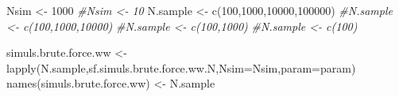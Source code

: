 \documentclass[
]{book}
\newenvironment{Shaded}{\begin{snugshade}}{\end{snugshade}}
\newcommand{\AttributeTok}[1]{\textcolor[rgb]{0.77,0.63,0.00}{#1}}
\newcommand{\CommentTok}[1]{\textcolor[rgb]{0.56,0.35,0.01}{\textit{#1}}}
\newcommand{\DecValTok}[1]{\textcolor[rgb]{0.00,0.00,0.81}{#1}}
\newcommand{\FunctionTok}[1]{\textcolor[rgb]{0.00,0.00,0.00}{#1}}
\newcommand{\NormalTok}[1]{#1}
\newcommand{\OtherTok}[1]{\textcolor[rgb]{0.56,0.35,0.01}{#1}}
\theoremstyle{definition}
\theoremstyle{definition}
\theoremstyle{definition}
\theoremstyle{definition}
\theoremstyle{remark}
\begin{document}
\begin{Shaded}
\begin{Highlighting}[]
\NormalTok{Nsim }\OtherTok{\textless{}{-}} \DecValTok{1000}
\CommentTok{\#Nsim \textless{}{-} 10}
\NormalTok{N.sample }\OtherTok{\textless{}{-}} \FunctionTok{c}\NormalTok{(}\DecValTok{100}\NormalTok{,}\DecValTok{1000}\NormalTok{,}\DecValTok{10000}\NormalTok{,}\DecValTok{100000}\NormalTok{)}
\CommentTok{\#N.sample \textless{}{-} c(100,1000,10000)}
\CommentTok{\#N.sample \textless{}{-} c(100,1000)}
\CommentTok{\#N.sample \textless{}{-} c(100)}

\NormalTok{simuls.brute.force.ww }\OtherTok{\textless{}{-}} \FunctionTok{lapply}\NormalTok{(N.sample,sf.simuls.brute.force.ww.N,}\AttributeTok{Nsim=}\NormalTok{Nsim,}\AttributeTok{param=}\NormalTok{param)}
\FunctionTok{names}\NormalTok{(simuls.brute.force.ww) }\OtherTok{\textless{}{-}}\NormalTok{ N.sample}
\end{Highlighting}
\end{Shaded}
\end{document}
